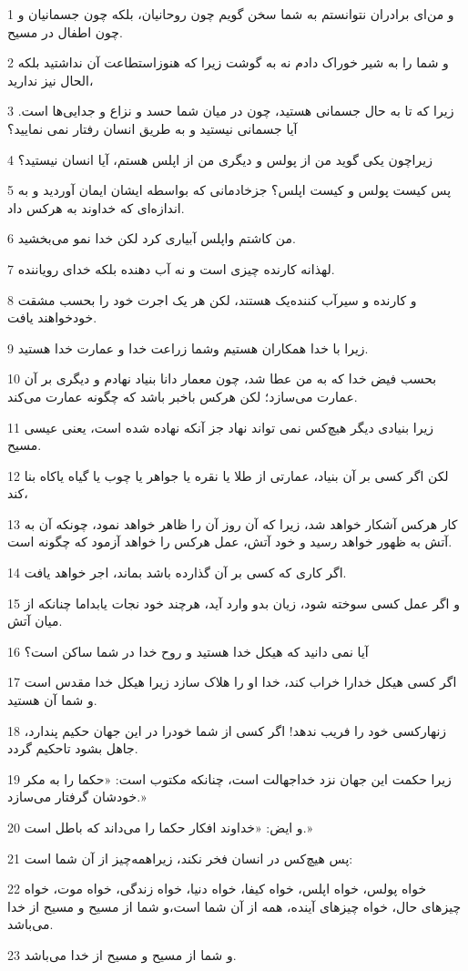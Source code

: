 \par 1 و من‌ای برادران نتوانستم به شما سخن گویم چون روحانیان، بلکه چون جسمانیان و چون اطفال در مسیح.
\par 2 و شما را به شیر خوراک دادم نه به گوشت زیرا که هنوزاستطاعت آن نداشتید بلکه الحال نیز ندارید،
\par 3 زیرا که تا به حال جسمانی هستید، چون در میان شما حسد و نزاع و جدایی‌ها است. آیا جسمانی نیستید و به طریق انسان رفتار نمی نمایید؟
\par 4 زیراچون یکی گوید من از پولس و دیگری من از اپلس هستم، آیا انسان نیستید؟
\par 5 پس کیست پولس و کیست اپلس؟ جزخادمانی که بواسطه ایشان ایمان آوردید و به اندازه‌ای که خداوند به هرکس داد.
\par 6 من کاشتم واپلس آبیاری کرد لکن خدا نمو می‌بخشید.
\par 7 لهذانه کارنده چیزی است و نه آب دهنده بلکه خدای رویاننده.
\par 8 و کارنده و سیرآب کننده‌یک هستند، لکن هر یک اجرت خود را بحسب مشقت خودخواهند یافت.
\par 9 زیرا با خدا همکاران هستیم وشما زراعت خدا و عمارت خدا هستید.
\par 10 بحسب فیض خدا که به من عطا شد، چون معمار دانا بنیاد نهادم و دیگری بر آن عمارت می‌سازد؛ لکن هرکس با‌خبر باشد که چگونه عمارت می‌کند.
\par 11 زیرا بنیادی دیگر هیچ‌کس نمی تواند نهاد جز آنکه نهاده شده است، یعنی عیسی مسیح.
\par 12 لکن اگر کسی بر آن بنیاد، عمارتی از طلا یا نقره یا جواهر یا چوب یا گیاه یاکاه بنا کند،
\par 13 کار هرکس آشکار خواهد شد، زیرا که آن روز آن را ظاهر خواهد نمود، چونکه آن به آتش به ظهور خواهد رسید و خود آتش، عمل هرکس را خواهد آزمود که چگونه است.
\par 14 اگر کاری که کسی بر آن گذارده باشد بماند، اجر خواهد یافت.
\par 15 و اگر عمل کسی سوخته شود، زیان بدو وارد آید، هرچند خود نجات یابداما چنانکه از میان آتش.
\par 16 آیا نمی دانید که هیکل خدا هستید و روح خدا در شما ساکن است؟
\par 17 اگر کسی هیکل خدارا خراب کند، خدا او را هلاک سازد زیرا هیکل خدا مقدس است و شما آن هستید.
\par 18 زنهارکسی خود را فریب ندهد! اگر کسی از شما خودرا در این جهان حکیم پندارد، جاهل بشود تاحکیم گردد.
\par 19 زیرا حکمت این جهان نزد خداجهالت است، چنانکه مکتوب است: «حکما را به مکر خودشان گرفتار می‌سازد.»
\par 20 و ایض: «خداوند افکار حکما را می‌داند که باطل است.»
\par 21 پس هیچ‌کس در انسان فخر نکند، زیراهمه‌چیز از آن شما است:
\par 22 خواه پولس، خواه اپلس، خواه کیفا، خواه دنیا، خواه زندگی، خواه موت، خواه چیزهای حال، خواه چیزهای آینده، همه از آن شما است،و شما از مسیح و مسیح از خدا می‌باشد.
\par 23 و شما از مسیح و مسیح از خدا می‌باشد.

